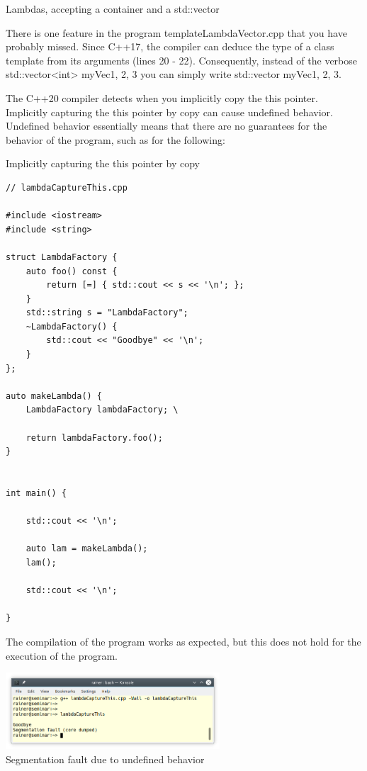 \begin{center}
Lambdas, accepting a container and a std::vector
\end{center}

\begin{tcolorbox}[colback=mygreen!5!white,colframe=mygreen!75!black,title={Class Template Argument Deduction}]
There is one feature in the program templateLambdaVector.cpp that you have probably missed. Since C++17, the compiler can deduce the type of a class template from its arguments (lines 20 - 22). Consequently, instead of the verbose std::vector<int> myVec{1, 2, 3} you can simply write std::vector myVec{1, 2, 3}.
\end{tcolorbox}


The C++20 compiler detects when you implicitly copy the this pointer. Implicitly capturing the this pointer by copy can cause undefined behavior. Undefined behavior essentially means that there are no guarantees for the behavior of the program, such as for the following:

\noindent
Implicitly capturing the this pointer by copy
\begin{lstlisting}[style=styleCXX]
// lambdaCaptureThis.cpp

#include <iostream>
#include <string>

struct LambdaFactory {
	auto foo() const {
		return [=] { std::cout << s << '\n'; };
	}
	std::string s = "LambdaFactory";
	~LambdaFactory() {
		std::cout << "Goodbye" << '\n';
	}
};

auto makeLambda() {
	LambdaFactory lambdaFactory; \
	
	return lambdaFactory.foo();
}


int main() {

	std::cout << '\n';
	
	auto lam = makeLambda();
	lam();
	
	std::cout << '\n';

}
\end{lstlisting}

The compilation of the program works as expected, but this does not hold for the execution of the program.

\begin{center}
\includegraphics[width=0.6\textwidth]{content/3/chapter4/images/42.png}\\
Segmentation fault due to undefined behavior
\end{center}

